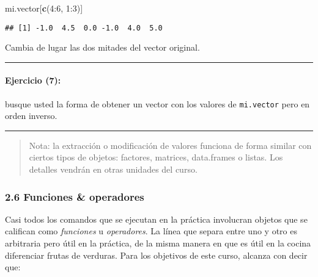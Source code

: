 \documentclass[]{article}
\newenvironment{Shaded}{}{}
\newcommand{\KeywordTok}[1]{\textcolor[rgb]{0.00,0.44,0.13}{\textbf{{#1}}}}
\newcommand{\DecValTok}[1]{\textcolor[rgb]{0.25,0.63,0.44}{{#1}}}
\newcommand{\NormalTok}[1]{{#1}}
\begin{document}
\begin{Shaded}
\begin{Highlighting}[]
\NormalTok{mi.vector[}\KeywordTok{c}\NormalTok{(}\DecValTok{4}\NormalTok{:}\DecValTok{6}\NormalTok{, }\DecValTok{1}\NormalTok{:}\DecValTok{3}\NormalTok{)]}
\end{Highlighting}
\end{Shaded}
\begin{verbatim}
## [1] -1.0  4.5  0.0 -1.0  4.0  5.0
\end{verbatim}
Cambia de lugar las dos mitades del vector original.

\begin{center}\rule{3in}{0.4pt}\end{center}

\paragraph{Ejercicio (7):}

busque usted la forma de obtener un vector con los valores de
\texttt{mi.vector} pero en orden inverso.

\begin{center}\rule{3in}{0.4pt}\end{center}

\begin{quote}
Nota: la extracción o modificación de valores funciona de forma similar
con ciertos tipos de objetos: factores, matrices, data.frames o listas.
Los detalles vendrán en otras unidades del curso.

\end{quote}
\subsubsection{2.6 Funciones \& operadores}

Casi todos los comandos que se ejecutan en la práctica involucran
objetos que se califican como \emph{funciones} u \emph{operadores}. La
línea que separa entre uno y otro es arbitraria pero útil en la
práctica, de la misma manera en que es útil en la cocina diferenciar
frutas de verduras. Para los objetivos de este curso, alcanza con decir
que:
\end{document}
